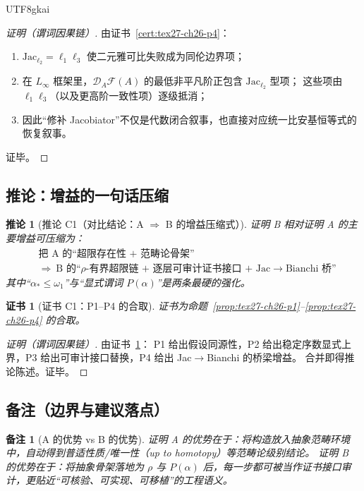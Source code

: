 \documentclass[12pt]{article}
\newtheorem{corollary}{推论}[section]
\newtheorem{remark}{备注}[section]
\newtheorem{Certificate}{证书}[section]
\begin{document}
\begin{CJK*}{UTF8}{gkai}
\begin{proof}[证明（谓词因果链）]
由证书~\ref{cert:tex27-ch26-p4}：
\begin{enumerate}
  \item $\mathrm{Jac}_{\ell_2}=\ell_1\ell_3$ 使二元雅可比失败成为同伦边界项；
  \item 在 $L_\infty$ 框架里，$\mathcal{D}_A\mathcal{F}(A)$ 的最低非平凡阶正包含 $\mathrm{Jac}_{\ell_2}$ 型项；
  这些项由 $\ell_1\ell_3$（以及更高阶一致性项）逐级抵消；
  \item 因此“修补 Jacobiator”不仅是代数闭合叙事，也直接对应统一比安基恒等式的恢复叙事。
\end{enumerate}
证毕。
\end{proof}

\subsection{推论：增益的一句话压缩}
\label{subsec:tex27-ch26-cor}

\begin{corollary}[推论 C1（对比结论：A $\Rightarrow$ B 的增益压缩式）]
\label{cor:tex27-ch26-c1}
证明 B 相对证明 A 的主要增益可压缩为：
\[
  \boxed{
  \begin{aligned}
    &\text{把 A 的“超限存在性 + 范畴论骨架”}\\
    &\Longrightarrow\ \text{B 的“$\rho$-有界超限链 + 逐层可审计证书接口 + Jac$\to$Bianchi 桥”}
  \end{aligned}
  }
\]
其中“$\alpha_\ast\le\omega_1$”与“显式谓词 $P(\alpha)$”是两条最硬的强化。
\end{corollary}

\begin{Certificate}[证书 C1：P1--P4 的合取]
\label{cert:tex27-ch26-c1}
证书为命题~\ref{prop:tex27-ch26-p1}--\ref{prop:tex27-ch26-p4} 的合取。
\end{Certificate}

\begin{proof}[证明（谓词因果链）]
由证书~\ref{cert:tex27-ch26-c1}：
P1 给出假设同源性，P2 给出稳定序数显式上界，P3 给出可审计接口替换，P4 给出 Jac$\to$Bianchi 的桥梁增益。
合并即得推论陈述。证毕。
\end{proof}

\subsection{备注（边界与建议落点）}
\label{subsec:tex27-ch26-remarks}

\begin{remark}[A 的优势 vs B 的优势]
证明 A 的优势在于：将构造放入抽象范畴环境中，自动得到普适性质/唯一性（up to homotopy）等范畴论级别结论。
证明 B 的优势在于：将抽象骨架落地为 $\rho$ 与 $P(\alpha)$ 后，每一步都可被当作证书接口审计，更贴近“可核验、可实现、可移植”的工程语义。
\end{remark}


\end{CJK*}
\end{document}
